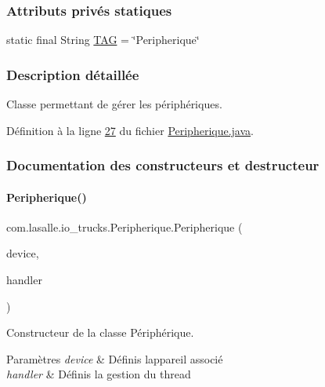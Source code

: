\subsubsection*{Attributs privés statiques}
\begin{DoxyCompactItemize}
\item 
static final String \hyperlink{classcom_1_1lasalle_1_1io__trucks_1_1_peripherique_a9ad17604c5e0a0ca93908a76af9db6cc}{T\+AG} = \char`\"{}Peripherique\char`\"{}
\end{DoxyCompactItemize}


\subsubsection{Description détaillée}
Classe permettant de gérer les périphériques. 

Définition à la ligne \hyperlink{_peripherique_8java_source_l00027}{27} du fichier \hyperlink{_peripherique_8java_source}{Peripherique.\+java}.



\subsubsection{Documentation des constructeurs et destructeur}
\mbox{\label{classcom_1_1lasalle_1_1io__trucks_1_1_peripherique_a89c00428bc04098ada95e4c5d4b4a168}} 
\paragraph{\texorpdfstring{Peripherique()}{Peripherique()}}
{\footnotesize\ttfamily com.\+lasalle.\+io\+\_\+trucks.\+Peripherique.\+Peripherique (\begin{DoxyParamCaption}\item[{Bluetooth\+Device}]{device,  }\item[{Handler}]{handler }\end{DoxyParamCaption})}



Constructeur de la classe Périphérique. 


\begin{DoxyParams}{Paramètres}
{\em device} & Définis l\textquotesingle{}appareil associé \\
\hline
{\em handler} & Définis la gestion du thread \\
\hline
\end{DoxyParams}


